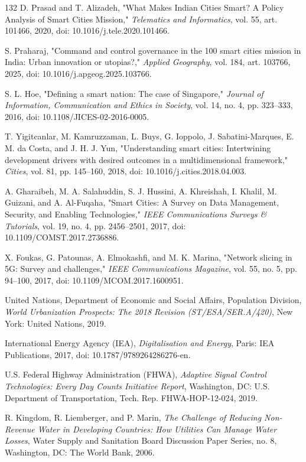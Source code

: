 \documentclass[pdflatex,sn-mathphys-num]{sn-jnl}%
\theoremstyle{thmstyleone}%
\theoremstyle{thmstyletwo}%
\theoremstyle{thmstylethree}%
\begin{document}
\begin{thebibliography}{132}
 D. Prasad and T. Alizadeh, "What Makes Indian Cities Smart? A Policy Analysis of Smart Cities Mission," \emph{Telematics and Informatics}, vol. 55, art. 101466, 2020, doi: 10.1016/j.tele.2020.101466.

 S. Praharaj, "Command and control governance in the 100 smart cities mission in India: Urban innovation or utopias?," \emph{Applied Geography}, vol. 184, art. 103766, 2025, doi: 10.1016/j.apgeog.2025.103766.

 S. L. Hoe, "Defining a smart nation: The case of Singapore," \emph{Journal of Information, Communication and Ethics in Society}, vol. 14, no. 4, pp. 323--333, 2016, doi: 10.1108/JICES-02-2016-0005.

 T. Yigitcanlar, M. Kamruzzaman, L. Buys, G. Ioppolo, J. Sabatini-Marques, E. M. da Costa, and J. H. J. Yun, "Understanding smart cities: Intertwining development drivers with desired outcomes in a multidimensional framework," \emph{Cities}, vol. 81, pp. 145--160, 2018, doi: 10.1016/j.cities.2018.04.003.

 A. Gharaibeh, M. A. Salahuddin, S. J. Hussini, A. Khreishah, I. Khalil, M. Guizani, and A. Al-Fuqaha, "Smart Cities: A Survey on Data Management, Security, and Enabling Technologies," \emph{IEEE Communications Surveys \& Tutorials}, vol. 19, no. 4, pp. 2456--2501, 2017, doi: 10.1109/COMST.2017.2736886.

 X. Foukas, G. Patounas, A. Elmokashfi, and M. K. Marina, "Network slicing in 5G: Survey and challenges," \emph{IEEE Communications Magazine}, vol. 55, no. 5, pp. 94--100, 2017, doi: 10.1109/MCOM.2017.1600951.

 United Nations, Department of Economic and Social Affairs, Population Division, \emph{World Urbanization Prospects: The 2018 Revision (ST/ESA/SER.A/420)}, New York: United Nations, 2019.

 International Energy Agency (IEA), \emph{Digitalisation and Energy}, Paris: IEA Publications, 2017, doi: 10.1787/9789264286276-en.

 U.S. Federal Highway Administration (FHWA), \emph{Adaptive Signal Control Technologies: Every Day Counts Initiative Report}, Washington, DC: U.S. Department of Transportation, Tech. Rep. FHWA-HOP-12-024, 2019.

 R. Kingdom, R. Liemberger, and P. Marin, \emph{The Challenge of Reducing Non-Revenue Water in Developing Countries: How Utilities Can Manage Water Losses}, Water Supply and Sanitation Board Discussion Paper Series, no. 8, Washington, DC: The World Bank, 2006.


\end{thebibliography}
\end{document}
